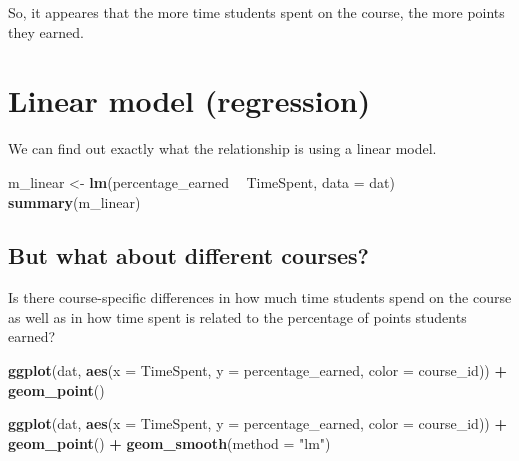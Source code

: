 \documentclass[]{book}
\newenvironment{Shaded}{\begin{snugshade}}{\end{snugshade}}
\newcommand{\KeywordTok}[1]{\textcolor[rgb]{0.13,0.29,0.53}{\textbf{#1}}}
\newcommand{\DataTypeTok}[1]{\textcolor[rgb]{0.13,0.29,0.53}{#1}}
\newcommand{\StringTok}[1]{\textcolor[rgb]{0.31,0.60,0.02}{#1}}
\newcommand{\OperatorTok}[1]{\textcolor[rgb]{0.81,0.36,0.00}{\textbf{#1}}}
\newcommand{\NormalTok}[1]{#1}
\begin{document}
So, it appeares that the more time students spent on the course, the
more points they earned.

\chapter{Linear model (regression)}\label{linear-model-regression}

We can find out exactly what the relationship is using a linear model.

\begin{Shaded}
\begin{Highlighting}[]
\NormalTok{m_linear <-}\StringTok{ }\KeywordTok{lm}\NormalTok{(percentage_earned }\OperatorTok{~}\StringTok{ }\NormalTok{TimeSpent, }\DataTypeTok{data =}\NormalTok{ dat)}
\KeywordTok{summary}\NormalTok{(m_linear)}
\end{Highlighting}
\end{Shaded}

\section{But what about different
courses?}\label{but-what-about-different-courses}

Is there course-specific differences in how much time students spend on
the course as well as in how time spent is related to the percentage of
points students earned?

\begin{Shaded}
\begin{Highlighting}[]
\KeywordTok{ggplot}\NormalTok{(dat, }\KeywordTok{aes}\NormalTok{(}\DataTypeTok{x =}\NormalTok{ TimeSpent, }\DataTypeTok{y =}\NormalTok{ percentage_earned, }\DataTypeTok{color =}\NormalTok{ course_id)) }\OperatorTok{+}
\StringTok{    }\KeywordTok{geom_point}\NormalTok{()}
\end{Highlighting}
\end{Shaded}

\begin{Shaded}
\begin{Highlighting}[]
\KeywordTok{ggplot}\NormalTok{(dat, }\KeywordTok{aes}\NormalTok{(}\DataTypeTok{x =}\NormalTok{ TimeSpent, }\DataTypeTok{y =}\NormalTok{ percentage_earned, }\DataTypeTok{color =}\NormalTok{ course_id)) }\OperatorTok{+}
\StringTok{    }\KeywordTok{geom_point}\NormalTok{() }\OperatorTok{+}
\StringTok{    }\KeywordTok{geom_smooth}\NormalTok{(}\DataTypeTok{method =} \StringTok{"lm"}\NormalTok{)}
\end{Highlighting}
\end{Shaded}
\end{document}
